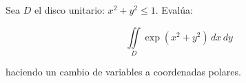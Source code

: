 Sea $D$ el disco unitario: $x^2+y^2 \leq 1$. Evalúa:

\[\iint\limits_D \exp(x^2 + y^2) \, dx \, dy\]

haciendo un cambio de variables a coordenadas polares.
